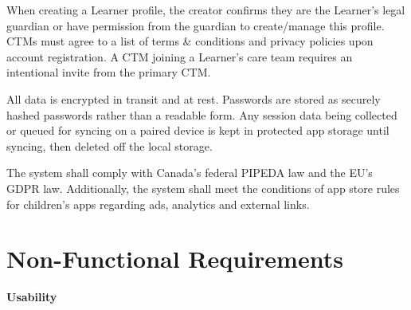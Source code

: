 \documentclass[12pt]{article}
\begin{document}
When creating a Learner profile, the creator confirms they are the Learner's legal guardian or have permission from the guardian to create/manage this profile. CTMs must agree to a list of terms \& conditions and privacy policies upon account registration. A CTM joining a Learner's care team requires an intentional invite from the primary CTM. 

All data is encrypted in transit and at rest. Passwords are stored as securely hashed passwords rather than a readable form. Any session data being collected or queued for syncing on a paired device is kept in protected app storage until syncing, then deleted off the local storage.

The system shall comply with Canada's federal PIPEDA law and the EU's GDPR law. Additionally, the system shall meet the conditions of app store rules for children's apps regarding ads, analytics and external links. 
\section{Non-Functional Requirements}





\textbf{Usability}
\end{document}
